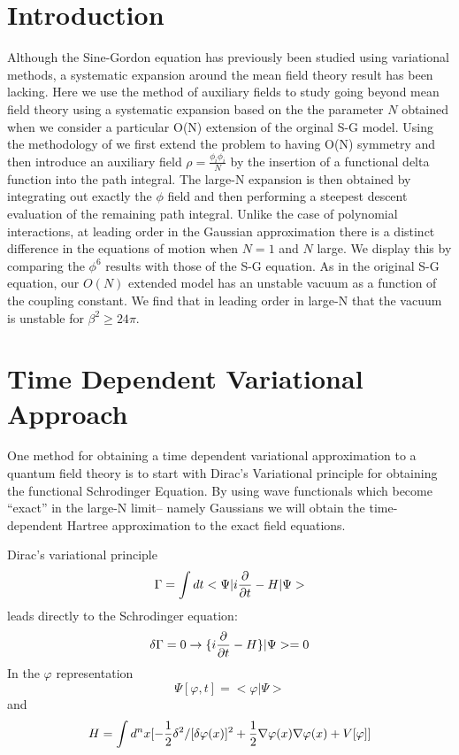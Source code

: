 \documentclass[a4paper,prd,preprint,superscriptaddress,showpacs,byrevtex]{revtex4}
\begin{document}
\section{Introduction}
Although the Sine-Gordon equation has previously been studied using
variational
methods, \cite{ref:Coleman} \cite{ref:Boy}
a systematic expansion around the mean field theory result has been lacking.
Here we use the method of auxiliary fields to study going beyond mean field
theory using a systematic expansion based on the the parameter $N$ obtained
when we consider a particular O(N) extension of the orginal S-G model.
Using the methodology of \cite{div}   \cite{ref:Eyal} we first extend the
problem to having O(N) symmetry and then introduce an auxiliary field $\rho=
\frac {\phi_i \phi_i}{N}$ by the insertion of a functional delta function
into the path integral. The large-N expansion is then obtained by
integrating
out exactly the $\phi$ field and then performing a steepest descent
evaluation
of the remaining path integral.  Unlike the case of polynomial interactions,
at leading order in the Gaussian approximation there is a distinct
difference
in the equations of motion when $N=1$ and $N$ large.  We display this
by comparing the $\phi^6$ results with those of the S-G equation.
As in the original S-G equation, our $O(N)$ extended model has an unstable
vacuum as a function of the coupling constant.  We find that in leading
order
in large-N that  the vacuum is unstable for $ \beta^2 \geq 24 \pi$.

\section{Time Dependent Variational Approach}
  One method for obtaining a time dependent
variational approximation to a quantum field theory is to
start with Dirac's Variational principle \cite{ref:Dirac} \cite{ref:Hartree}for
obtaining the functional Schrodinger Equation. By using wave functionals which
become ``exact'' in the
large-N limit-- namely Gaussians we will obtain the time-dependent Hartree
approximation to the exact field equations.

 Dirac's
variational principle
\begin{equation}
\Gamma = \int dt < \Psi | i {\partial
\over \partial t} -H| \Psi >
\end{equation}
leads directly to the Schrodinger equation:
\begin{equation}
 \delta\Gamma = 0 \rightarrow
\{ i {\partial \over \partial t} - H \} |\Psi > = 0
\end{equation}
In the $\varphi$ representation
\[ \Psi[\varphi,t] = < \varphi |\Psi > \]
and
\begin{equation}
H= \int d^n x [ -{1 \over 2} \delta^2/[\delta \varphi(x)]^2+ {1 \over 2}
\nabla
\varphi(x) \nabla \varphi(x) + V[\varphi] ]
\end{equation}
\end{document}
